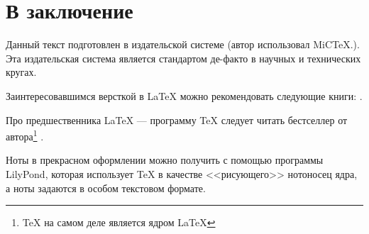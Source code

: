 \chapter*{В заключение}

Данный текст подготовлен в издательской системе {\LaTeXe} (автор использовал MiC\TeX.). Эта издательская система является стандартом де-факто в научных и технических кругах.

Заинтересовавшимся версткой в {\LaTeX} можно рекомендовать следующие книги: \cite{bib:cotelnikov,bib:baldin}.

Про предшественника {\LaTeX} --- программу {\TeX} следует читать бестселлер от автора\footnote{{\TeX} на самом деле является ядром \LaTeX} \cite{bib:knuth:AllAbout}.

Ноты в прекрасном оформлении можно получить с помощью программы LilyPond, которая использует {\TeX} в качестве <<рисующего>> нотоносец ядра, а ноты задаются в особом текстовом формате.
